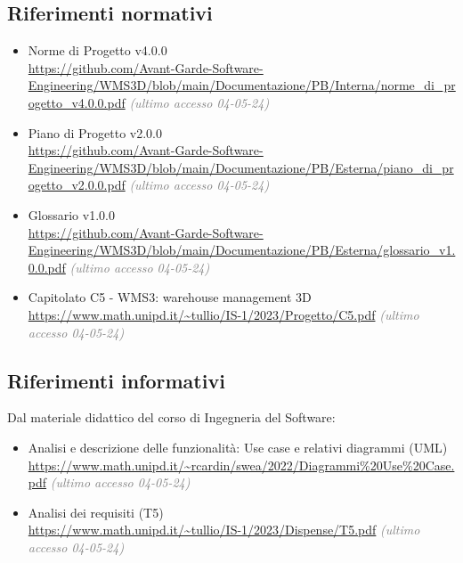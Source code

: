 \subsection{Riferimenti normativi}\label{sec:riferimenti_normativi}
\begin{itemize}
    \item Norme di Progetto v4.0.0 \\
    \url{https://github.com/Avant-Garde-Software-Engineering/WMS3D/blob/main/Documentazione/PB/Interna/norme_di_progetto_v4.0.0.pdf} \textcolor{gray}{\textit{(ultimo accesso 04-05-24)}}
    \item Piano di Progetto v2.0.0 \\
    \url{https://github.com/Avant-Garde-Software-Engineering/WMS3D/blob/main/Documentazione/PB/Esterna/piano_di_progetto_v2.0.0.pdf} \textcolor{gray}{\textit{(ultimo accesso 04-05-24)}}
    \item Glossario v1.0.0 \\
    \url{https://github.com/Avant-Garde-Software-Engineering/WMS3D/blob/main/Documentazione/PB/Esterna/glossario_v1.0.0.pdf} \textcolor{gray}{\textit{(ultimo accesso 04-05-24)}}
    \item Capitolato C5 - WMS3: warehouse management 3D \\
    \url{https://www.math.unipd.it/~tullio/IS-1/2023/Progetto/C5.pdf} \textcolor{gray}{\textit{(ultimo accesso 04-05-24)}}
\end{itemize}

\subsection{Riferimenti informativi}\label{sec:riferimenti_informativi}
Dal materiale didattico del corso di Ingegneria del Software:
\begin{itemize}
    \item Analisi e descrizione delle funzionalità: Use case e relativi diagrammi (UML) \\
    \url{https://www.math.unipd.it/~rcardin/swea/2022/Diagrammi%20Use%20Case.pdf} \textcolor{gray}{\textit{(ultimo accesso 04-05-24)}}
    \item Analisi dei requisiti (T5) \\
    \url{https://www.math.unipd.it/~tullio/IS-1/2023/Dispense/T5.pdf} \textcolor{gray}{\textit{(ultimo accesso 04-05-24)}}
\end{itemize}
